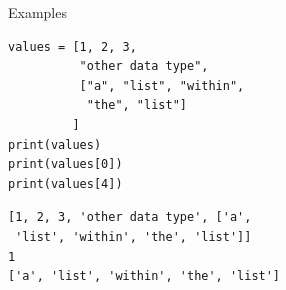 \begin{frame}[fragile]{Examples}
%
\begin{tcbraster}[raster columns=2,
                  raster equal height,
                  nobeforeafter,
                  raster column skip=0.5cm]
\begin{codebox}
\begin{verbatim}
values = [1, 2, 3, 
          "other data type", 
          ["a", "list", "within", 
           "the", "list"]
         ]
print(values)
print(values[0])
print(values[4])
\end{verbatim}
\end{codebox}
%
\begin{cmdbox}
\begin{verbatim}
[1, 2, 3, 'other data type', ['a', 
 'list', 'within', 'the', 'list']]
1
['a', 'list', 'within', 'the', 'list']
\end{verbatim}
\end{cmdbox}
\end{tcbraster}
%
\end{frame}


